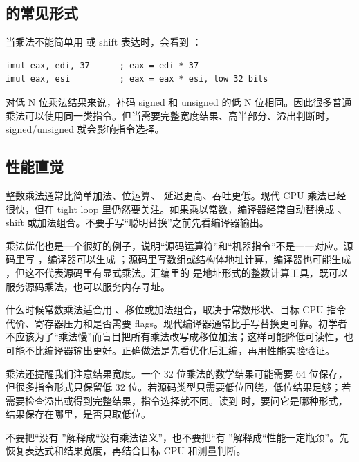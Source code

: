 \subsection{ 的常见形式}

当乘法不能简单用  或 shift 表达时，会看到 ：

\begin{lstlisting}
imul eax, edi, 37      ; eax = edi * 37
imul eax, esi          ; eax = eax * esi, low 32 bits
\end{lstlisting}

对低 N 位乘法结果来说，补码 signed 和 unsigned 的低 N 位相同。因此很多普通乘法可以使用同一类指令。但当需要完整宽度结果、高半部分、溢出判断时，signed/unsigned 就会影响指令选择。

\subsection{性能直觉}

整数乘法通常比简单加法、位运算、 延迟更高、吞吐更低。现代 CPU 乘法已经很快，但在 tight loop 里仍然要关注。如果乘以常数，编译器经常自动替换成 、shift 或加法组合。不要手写“聪明替换”之前先看编译器输出。

乘法优化也是一个很好的例子，说明“源码运算符”和“机器指令”不是一一对应。源码里写 ，编译器可以生成 ；源码里写数组或结构体地址计算，编译器也可能生成 ，但这不代表源码里有显式乘法。汇编里的  是地址形式的整数计算工具，既可以服务源码乘法，也可以服务内存寻址。

什么时候常数乘法适合用 、移位或加法组合，取决于常数形状、目标 CPU 指令代价、寄存器压力和是否需要 flags。现代编译器通常比手写替换更可靠。初学者不应该为了“乘法慢”而盲目把所有乘法改写成移位加法；这样可能降低可读性，也可能不比编译器输出更好。正确做法是先看优化后汇编，再用性能实验验证。

乘法还提醒我们注意结果宽度。一个 32 位乘法的数学结果可能需要 64 位保存，但很多指令形式只保留低 32 位。若源码类型只需要低位回绕，低位结果足够；若需要检查溢出或得到完整结果，指令选择就不同。读到  时，要问它是哪种形式，结果保存在哪里，是否只取低位。

\begin{warningbox}
不要把“没有 ”解释成“没有乘法语义”，也不要把“有 ”解释成“性能一定瓶颈”。先恢复表达式和结果宽度，再结合目标 CPU 和测量判断。
\end{warningbox}

